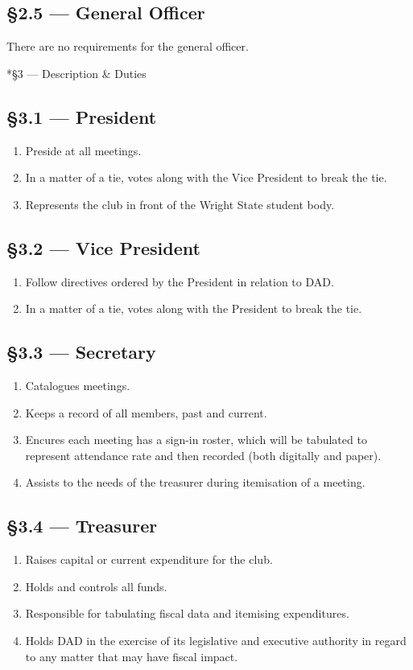 \documentclass[11pt]{report}
\makeatletter
\renewcommand{\section}{\@startsection{subsection}{2}{0mm}{-\baselineskip}{0.5\baselineskip}{\normalfont\large\bf}}
\makeatother
\begin{document}
	\subsection*{\S2.5 --- General Officer}
	There are no requirements for the general officer.
	
	\section*{\S3 --- Description \& Duties}
	
	\subsection*{\S3.1 --- President}
	\begin{enumerate}
		\item Preside at all meetings.
		\item In a matter of a tie, votes along with the Vice President to break the tie.
		\item Represents the club in front of the Wright State student body.
	\end{enumerate}
	\subsection*{\S3.2 --- Vice President}
	\begin{enumerate}
		\item Follow directives ordered by the President in relation to DAD.
		\item In a matter of a tie, votes along with the President to break the tie.
	\end{enumerate}
	\subsection*{\S3.3 --- Secretary}
	\begin{enumerate}
		\item Catalogues meetings.
		\item Keeps a record of all members, past and current.
		\item Encures each meeting has a sign-in roster, which will be tabulated to represent attendance rate and then recorded (both digitally and paper).
		\item Assists to the needs of the treasurer during itemisation of a meeting.
	\end{enumerate}
	
	\subsection*{\S3.4 --- Treasurer}
	\begin{enumerate}
		\item Raises capital or current expenditure for the club.
		\item Holds and controls all funds.
		\item Responsible for tabulating fiscal data and itemising expenditures.
		\item Holds DAD in the exercise of its legislative and executive authority in regard to any matter that may have fiscal impact.
	\end{enumerate}
	
\end{document}
